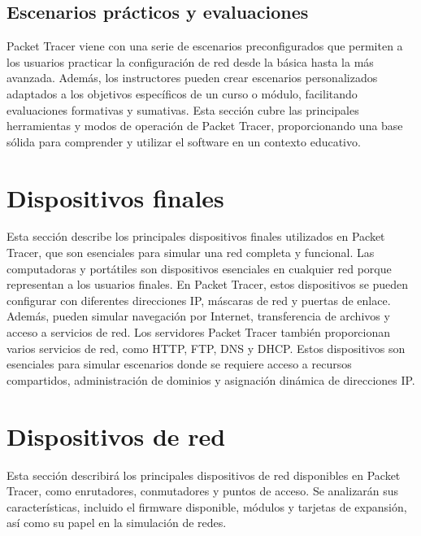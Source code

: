 \documentclass[a4paper,12pt]{article}
\begin{document}
\subsection{Escenarios prácticos y evaluaciones}
Packet Tracer viene con una serie de escenarios preconfigurados que permiten a los usuarios practicar la configuración de red desde la básica hasta la más avanzada. Además, los instructores pueden crear escenarios personalizados adaptados a los objetivos específicos de un curso o módulo, facilitando evaluaciones formativas y sumativas.
Esta sección cubre las principales herramientas y modos de operación de Packet Tracer, proporcionando una base sólida para comprender y utilizar el software en un contexto educativo.

\section{Dispositivos finales}
Esta sección describe los principales dispositivos finales utilizados en Packet Tracer, que son esenciales para simular una red completa y funcional.
Las computadoras y portátiles son dispositivos esenciales en cualquier red porque representan a los usuarios finales. En Packet Tracer, estos dispositivos se pueden configurar con diferentes direcciones IP, máscaras de red y puertas de enlace. Además, pueden simular navegación por Internet, transferencia de archivos y acceso a servicios de red.
Los servidores Packet Tracer también proporcionan varios servicios de red, como HTTP, FTP, DNS y DHCP. Estos dispositivos son esenciales para simular escenarios donde se requiere acceso a recursos compartidos, administración de dominios y asignación dinámica de direcciones IP.

\section{Dispositivos de red}
Esta sección describirá los principales dispositivos de red disponibles en Packet Tracer, como enrutadores, conmutadores y puntos de acceso. Se analizarán sus características, incluido el firmware disponible, módulos y tarjetas de expansión, así como su papel en la simulación de redes.
\end{document}
